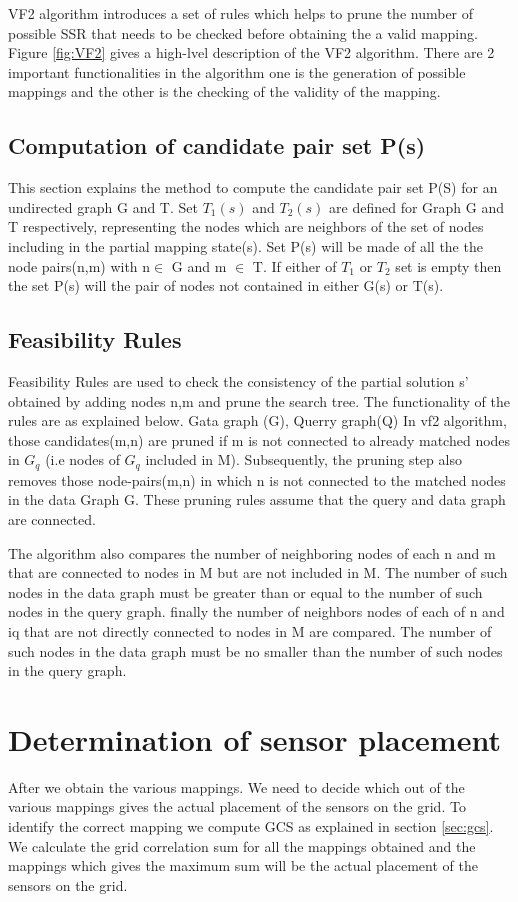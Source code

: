 VF2 algorithm introduces a set of rules which helps to prune the number of possible SSR that needs to be checked before obtaining the a valid mapping. Figure \ref{fig:VF2} gives a high-lvel description of the VF2 algorithm.
There are 2 important functionalities in the algorithm one is the generation of possible mappings and the other is the checking of the validity of the mapping.

\subsection{Computation of candidate pair set P(s)}
This section explains the method to compute the candidate pair set P(S) for an undirected graph G and T. 
Set $T_1(s)$ and $T_2(s)$ are defined for Graph G and T respectively, representing the nodes which are neighbors of the set of nodes including in the partial mapping state(s).
Set P(s) will be made of all the the node pairs(n,m) with n$\in$ G and m $\in$ T. If either of $T_1$ or $T_2$ set is empty then the set P(s) will the pair of nodes not contained in either G(s) or T(s).
\subsection{Feasibility Rules}
Feasibility Rules are used to check the consistency of the partial solution s' obtained by adding nodes n,m and prune the search tree. The functionality of the rules are as explained below.
Gata graph (G), Querry graph(Q)
In vf2 algorithm, those candidates(m,n) are pruned if m is not connected to already matched nodes in $G_q$
(i.e nodes of $G_q$ included in M).
Subsequently, the pruning step also removes those node-pairs(m,n) in which n is not connected to the matched 
nodes in the data Graph G. These pruning rules assume that the query and data graph are connected.

The algorithm also compares the number of neighboring nodes of each n and m that are connected to nodes in M but are not
included in M. The number of such nodes in the data graph must be greater than or equal to the number of such nodes in the query graph.
finally the number of neighbors nodes of each of n and iq that are not directly connected to nodes in M are compared. The number of 
such nodes in the data graph must be no smaller than the number of such nodes in the query graph.

\section{Determination of sensor placement}
After we obtain the various mappings. We need to decide which out of the various mappings gives the actual placement of the sensors on the grid. To identify the correct mapping we compute GCS as explained in section \ref{sec:gcs}. We calculate the grid correlation sum for all the mappings obtained and the mappings which gives the maximum sum will be the actual placement of the sensors on the grid.





 






 


